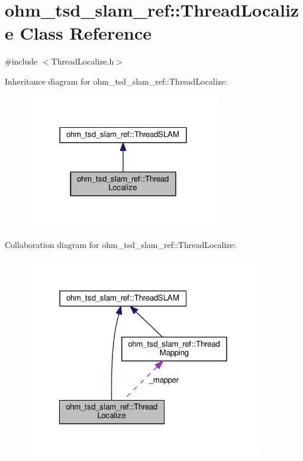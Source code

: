 \hypertarget{classohm__tsd__slam__ref_1_1ThreadLocalize}{\section{ohm\-\_\-tsd\-\_\-slam\-\_\-ref\-:\-:Thread\-Localize Class Reference}
\label{classohm__tsd__slam__ref_1_1ThreadLocalize}
}


{\ttfamily \#include $<$Thread\-Localize.\-h$>$}



Inheritance diagram for ohm\-\_\-tsd\-\_\-slam\-\_\-ref\-:\-:Thread\-Localize\-:\nopagebreak
\begin{figure}[H]
\begin{center}
\leavevmode
\includegraphics[width=240pt]{classohm__tsd__slam__ref_1_1ThreadLocalize__inherit__graph}
\end{center}
\end{figure}


Collaboration diagram for ohm\-\_\-tsd\-\_\-slam\-\_\-ref\-:\-:Thread\-Localize\-:\nopagebreak
\begin{figure}[H]
\begin{center}
\leavevmode
\includegraphics[width=291pt]{classohm__tsd__slam__ref_1_1ThreadLocalize__coll__graph}
\end{center}
\end{figure}
